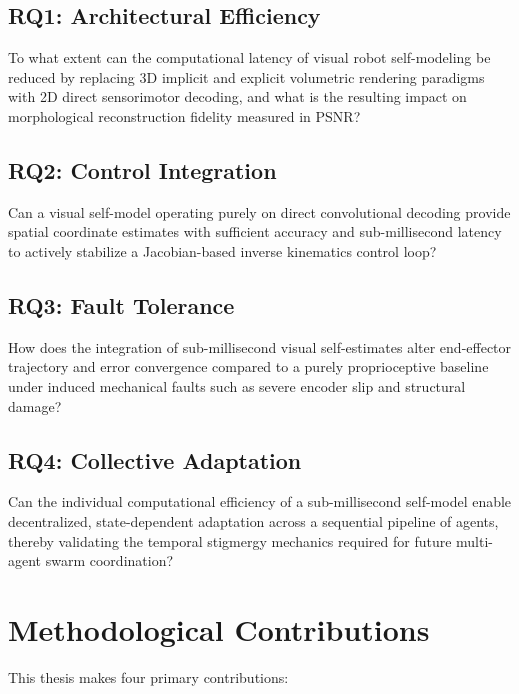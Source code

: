 \documentclass[12pt,a4paper,oneside]{report}
\begin{document}
\subsection{RQ1: Architectural Efficiency}
\label{subsec:RQ1_intro}

To what extent can the computational latency of visual robot self-modeling be reduced by replacing 3D implicit and explicit volumetric rendering paradigms with 2D direct sensorimotor decoding, and what is the resulting impact on morphological reconstruction fidelity measured in PSNR?

\subsection{RQ2: Control Integration}
\label{subsec:RQ2_intro}

Can a visual self-model operating purely on direct convolutional decoding provide spatial coordinate estimates with sufficient accuracy and sub-millisecond latency to actively stabilize a Jacobian-based inverse kinematics control loop?

\subsection{RQ3: Fault Tolerance}
\label{subsec:RQ3_intro}

How does the integration of sub-millisecond visual self-estimates alter end-effector trajectory and error convergence compared to a purely proprioceptive baseline under induced mechanical faults such as severe encoder slip and structural damage?

\subsection{RQ4: Collective Adaptation}
\label{subsec:RQ4_intro}

Can the individual computational efficiency of a sub-millisecond self-model enable decentralized, state-dependent adaptation across a sequential pipeline of agents, thereby validating the temporal stigmergy mechanics required for future multi-agent swarm coordination?

\section{Methodological Contributions}
\label{sec:methodological_contributions_intro}

This thesis makes four primary contributions:
\end{document}
